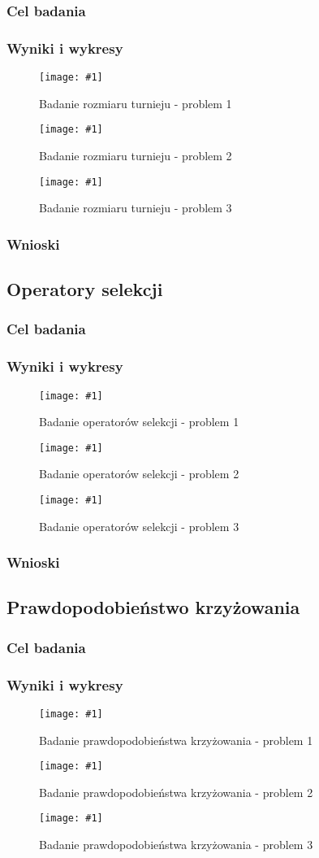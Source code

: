 \documentclass[12pt,a4paper]{article}
\newcommand{\image}[2] {
    \begin{figure}[H]
        \begin{center}
            \texttt{[image: \#1]}
        \end{center}
        \caption{#2}
        \label{#1}
    \end{figure}
}
\begin{document}
\subsubsection{Cel badania}
\subsubsection{Wyniki i wykresy}
\image{images/Badanie rozmiaru turnieju_1}{Badanie rozmiaru turnieju - problem 1}
\image{images/Badanie rozmiaru turnieju_2}{Badanie rozmiaru turnieju - problem 2}
\image{images/Badanie rozmiaru turnieju_3}{Badanie rozmiaru turnieju - problem 3}
\subsubsection{Wnioski}
\subsection{Operatory selekcji}
\subsubsection{Cel badania}
\subsubsection{Wyniki i wykresy}
\image{images/Badanie operatorów_1}{Badanie operatorów selekcji - problem 1}
\image{images/Badanie operatorów_2}{Badanie operatorów selekcji - problem 2}
\image{images/Badanie operatorów_3}{Badanie operatorów selekcji - problem 3}
\subsubsection{Wnioski}
\subsection{Prawdopodobieństwo krzyżowania}
\subsubsection{Cel badania}
\subsubsection{Wyniki i wykresy}
\image{images/Badanie p. krzyżowania_1}{Badanie prawdopodobieństwa krzyżowania - problem 1}
\image{images/Badanie p. krzyżowania_2}{Badanie prawdopodobieństwa krzyżowania - problem 2}
\image{images/Badanie p. krzyżowania_3}{Badanie prawdopodobieństwa krzyżowania - problem 3}
\end{document}
